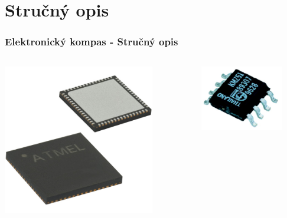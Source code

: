 \section{Stručný opis}
\begin{snimka}
 \frametitle{Elektronický kompas - Stručný opis}
   \begin{columns}[c]
   {
    \begin{column}{0.6\textwidth}
     \begin{center}
        \includegraphics[width=0.8\textwidth]{obr/am7.jpg}
      \end{center}
    \end{column}
    }
   {
    \begin{column}{0.6\textwidth}
     \begin{center}
        \includegraphics[width=0.8\textwidth]{obr/kmz.jpg}
      \end{center}
    \end{column}
    }


\end{columns}
\end{snimka}
